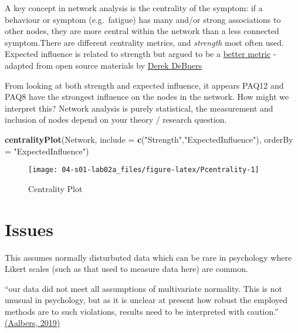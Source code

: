 \documentclass[]{book}
\newenvironment{Shaded}{\begin{snugshade}}{\end{snugshade}}
\newcommand{\DataTypeTok}[1]{\textcolor[rgb]{0.13,0.29,0.53}{#1}}
\newcommand{\KeywordTok}[1]{\textcolor[rgb]{0.13,0.29,0.53}{\textbf{#1}}}
\newcommand{\NormalTok}[1]{#1}
\newcommand{\StringTok}[1]{\textcolor[rgb]{0.31,0.60,0.02}{#1}}
\begin{document}
A key concept in network analysis is the centrality of the symptom: if a behaviour or symptom (e.g.~fatigue) has many and/or strong associations to other nodes, they are more central within the network than a less connected symptom.There are different centrality metrics, and \emph{strength} most often used. Expected influence is related to strength but argued to be a \href{https://psych-networks.com/expected-influence-new-centrality-metric-robinaugh-et-al-2016/}{better metric} - adapted from open source materials by \href{https://derekdebeurs.github.io/esssb17/}{Derek DeBuers}

From looking at both strength and expected influence, it appears PAQ12 and PAQ8 have the strongest influence on the nodes in the network. How might we interpret this? Network analysis is purely statistical, the measurement and inclusion of nodes depend on your theory / research question.

\begin{Shaded}
\begin{Highlighting}[]
\KeywordTok{centralityPlot}\NormalTok{(Network, }\DataTypeTok{include =} \KeywordTok{c}\NormalTok{(}\StringTok{"Strength"}\NormalTok{,}\StringTok{"ExpectedInfluence"}\NormalTok{),}
               \DataTypeTok{orderBy =} \StringTok{"ExpectedInfluence"}\NormalTok{)}
\end{Highlighting}
\end{Shaded}

\begin{figure}

{\centering \texttt{[image: 04-s01-lab02a\_files/figure-latex/Pcentrality-1]} 

}

\caption{Centrality Plot}\label{fig:Pcentrality}
\end{figure}

\hypertarget{issues}{%
\section{Issues}\label{issues}}

This assumes normally disturbuted data which can be rare in psychology where Likert scales (such as that used to measure data here) are common.

``our data did not meet all assumptions of multivariate normality. This is not unusual in psychology, but as it is unclear at present how robust the employed methods are to such violations, results need to be interpreted with caution.'' \href{https://openaccess.leidenuniv.nl/bitstream/handle/1887/73951/Aalbers_et_al_2018_T.pdf?sequence=1}{(Aalbers, 2019)}
\end{document}

